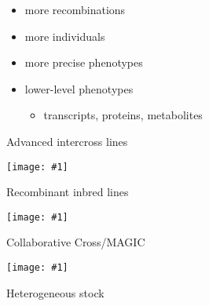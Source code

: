 \documentclass[12pt]{article}
\newcommand{\headsize}{\fontsize{35}{35} \selectfont}
\newcommand{\smallsize}{\fontsize{25}{30} \selectfont}
\newcommand{\smallersize}{\fontsize{20}{25} \selectfont}
\newcommand{\figh}[2]{\centerline{\texttt{[image: \#1]}}}
\begin{document}
\color{mywhite} \smallsize

\hfill \begin{minipage}[t]{9.5in}
\begin{itemize}
\itemsep24pt
\setlength{\rightskip}{0pt plus 1fil} %
\item more recombinations
\item more individuals
\item more precise phenotypes
\item lower-level phenotypes
  \begin{itemize}
  \item[] {\color{myblue} \smallersize transcripts, proteins, metabolites}
  \end{itemize}
\end{itemize} \end{minipage}


\newpage



\headsize \color{myyellow}
\hfill \begin{minipage}{5.75in}
\centering
Advanced intercross lines
\end{minipage}

\vspace{5mm}

\figh{Figs/ail.pdf}{0.9}

\newpage


\headsize \color{myyellow}
\hfill \begin{minipage}{5.75in}
\centering
Recombinant inbred lines
\end{minipage}

\vspace{5mm}

\figh{Figs/rilines.pdf}{0.9}

\newpage



\headsize \color{myyellow}
\hfill \begin{minipage}{6.75in}
\centering
Collaborative Cross/MAGIC
\end{minipage}

\vspace{5mm}

\figh{Figs/ri8.pdf}{0.9}


\newpage

\headsize \color{myyellow}
\hfill \begin{minipage}{5.75in}
\centering
Heterogeneous stock
\end{minipage}
\end{document}

